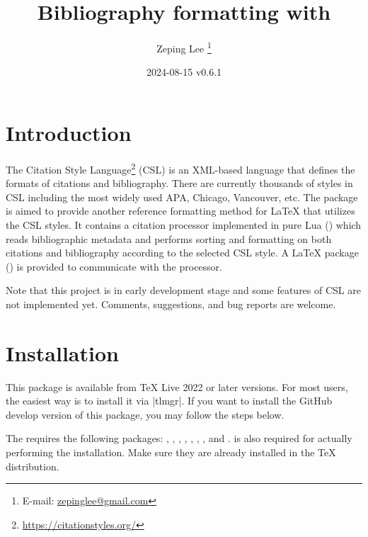 \documentclass{l3doc}
\begin{document}
\title{%
  Bibliography formatting with 
}

\author{%
  Zeping Lee%
  \thanks{%
    E-mail:
    \href{mailto:zepinglee@gmail.com}
      {zepinglee@gmail.com}%
  }%
}

\date{2024-08-15 v0.6.1}

\maketitle


\begin{documentation}

\section{Introduction}

The Citation Style Language\footnote{\url{https://citationstyles.org/}} (CSL)
is an XML-based language that defines the formats of citations and bibliography.
There are currently thousands of styles in CSL including the most widely used
APA, Chicago, Vancouver, etc.
The  package is aimed to provide another reference formatting method
for LaTeX that utilizes the CSL styles.
It contains a citation processor implemented in pure Lua ()
which reads bibliographic metadata and performs sorting and formatting on both
citations and bibliography according to the selected CSL style.
A LaTeX package () is provided to communicate with the processor.

Note that this project is in early development stage and some features of CSL
are not implemented yet.
Comments, suggestions, and bug reports are welcome.


\section{Installation}

This package is available from TeX Live 2022 or later versions.
For most users, the easiest way is to install it via |tlmgr|.
If you want to install the GitHub develop version of this package,
you may follow the steps below.

The  requires the following packages:
, , , , ,
, , and .
 is also required for actually performing the installation.
Make sure they are already installed in the TeX distribution.


\end{documentation}
\end{document}
